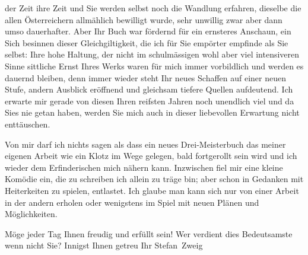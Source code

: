                der Zeit ihre Zeit und Sie werden selbst noch die Wandlung erfahren, die{\pb}selbe die allen Österreichern allmählich bewilligt wurde, sehr unwillig zwar aber dann umso
               dauerhafter. Aber Ihr Buch war
               fördernd für ein ernsteres Anschaun, ein Sich besinnen dieser Gleichgiltigkeit, die
               ich für Sie empörter empfinde als Sie selbst: Ihre hohe Haltung, der nicht im
               schulmässigen wohl aber viel intensiveren Sinne sittliche Ernst Ihres Werks waren für
               mich immer vorbildlich und werden es dauernd bleiben, denn immer wieder steht Ihr
               neues Schaffen auf einer neuen Stufe, andern Ausblick eröffnend und gleichsam tiefere
               Quellen aufdeutend. Ich erwarte mir gerade von diesen Ihren reifsten Jahren noch
               unendlich viel und da Sies nie getan haben, werden Sie mich auch in dieser
               liebevollen Erwartung nicht enttäuschen.\pend
           
\pstart
           Von mir darf ich nichts sagen als dass ein neues Drei-Meisterbuch das meiner eigenen Arbeit wie ein Klotz im
               Wege gelegen, bald fortgerollt sein wird und ich wieder dem Erfinderischen mich
               nähern kann. Inzwischen fiel mir eine kleine Komödie ein, die zu schreiben ich allein zu träge bin; aber
               schon in Gedanken mit Heiterkeiten zu spielen, entlastet. Ich glaube man kann sich
               nur von einer Arbeit in der andern erholen oder wenigstens im Spiel mit neuen Plänen
               und Möglichkeiten.\pend
           
\pstart
           Möge jeder Tag Ihnen freudig und erfüllt sein! Wer verdient dies Bedeutsamste wenn
               nicht Sie?\pend
           \pstart Innigst Ihnen getreu Ihr \spacefill\mbox{Stefan Zweig}\pend{}\endnumbering{}  \newcommand{\dateiname}{L03682}\newcommand{\titel}{Stefan Zweig an Arthur Schnitzler, 7. 1. 192[8?]}\newcommand{\editorInnen}{Selma Jahnke und Martin Anton Müller}
